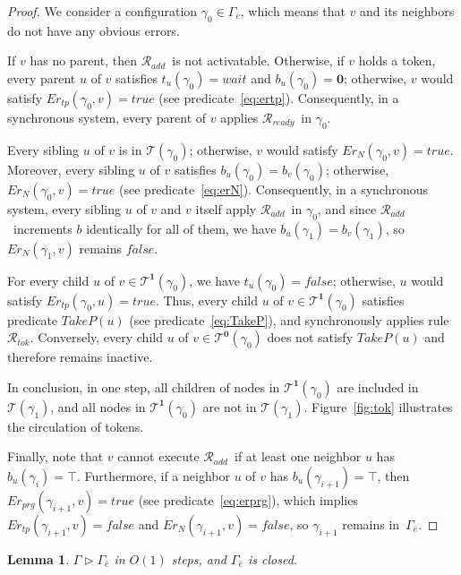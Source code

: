 \documentclass[a4paper, 12pt]{article}
\newtheorem{lemma}[theorem]{Lemma}
\newcommand{\bz}{\mathbf{0}}
\newcommand{\bo}{\mathbf{1}}
\newcommand{\Rtok}{$\mathscr{R}_{tok}$}
\newcommand{\Radd}{$\mathscr{R}_{add}$}
\newcommand{\Rready}{$\mathscr{R}_{ready}$}
\begin{document}
\begin{proof}
We consider a configuration $\gamma_0 \in \Gamma_{\bar{e}}$, which means 
that $v$ and its neighbors do not have any obvious errors.

If $v$ has no parent, then \Radd\ is not activatable. Otherwise, if $v$ 
holds a token, every parent $u$ of $v$ satisfies $t_u(\gamma_0) = 
\mathit{wait}$ and $b_u(\gamma_0) = \bz$; otherwise, $v$ would satisfy 
$Er_{tp}(\gamma_0, v) = \mathit{true}$ (see predicate~\ref{eq:ertp}). 
Consequently, in a synchronous system, every parent of $v$ applies 
\Rready\ in $\gamma_0$.

Every sibling $u$ of $v$ is in $\mathcal{T}(\gamma_0)$; otherwise, $v$ 
would satisfy $Er_{N}(\gamma_0,v) = \mathit{true}$. Moreover, every 
sibling $u$ of $v$ satisfies $b_u(\gamma_0) = b_v(\gamma_0)$; otherwise, 
$Er_{N}(\gamma_0, v) = \mathit{true}$ (see predicate~\ref{eq:erN}). 
Consequently, in a synchronous system, every sibling $u$ of $v$ and $v$ 
itself apply \Radd\ in $\gamma_0$, and since \Radd\ increments $b$ 
identically for all of them, we have $b_u(\gamma_1) = b_v(\gamma_1)$, 
so $Er_{N}(\gamma_1, v)$ remains $\mathit{false}$.

For every child $u$ of $v \in \mathcal{T}^{\bo}(\gamma_0)$, we have 
$t_u(\gamma_0) = \mathit{false}$; otherwise, $u$ would satisfy 
$Er_{tp}(\gamma_0,u) = \mathit{true}$. Thus, every child $u$ of 
$v \in \mathcal{T}^{\bo}(\gamma_0)$ satisfies predicate 
$\mathit{TakeP}(u)$ (see predicate~\ref{eq:TakeP}), and synchronously 
applies rule \Rtok. Conversely, every child $u$ of 
$v \in \mathcal{T}^{\bz}(\gamma_0)$ does not satisfy 
$\mathit{TakeP}(u)$ and therefore remains inactive.

In conclusion, in one step, all children of nodes in 
$\mathcal{T}^{\bo}(\gamma_0)$ are included in $\mathcal{T}(\gamma_1)$, 
and all nodes in $\mathcal{T}^{\bo}(\gamma_0)$ are not in 
$\mathcal{T}(\gamma_1)$. Figure~\ref{fig:tok} illustrates the 
circulation of tokens.

Finally, note that $v$ cannot execute \Radd\ if at least one neighbor 
$u$ has \mbox{$b_u(\gamma_i) = \top$}. Furthermore, if a neighbor $u$ of $v$ 
has $b_u(\gamma_{i+1}) = \top$, then $Er_{prg}(\gamma_{i+1}, v) = 
\mathit{true}$ (see predicate~\ref{eq:erprg}), which implies 
$Er_{tp}(\gamma_{i+1}, v) = \mathit{false}$ and $Er_{N}(\gamma_{i+1}, 
v) = \mathit{false}$, so $\gamma_{i+1}$ remains in~$\Gamma_{\bar{e}}$.
\end{proof}

\begin{lemma}
\label{lem:errorFree}
$\Gamma \triangleright \Gamma_{\bar{e}}$ in $O(1)$ steps, and 
$\Gamma_{\bar{e}}$ is closed.
\end{lemma}
\end{document}
